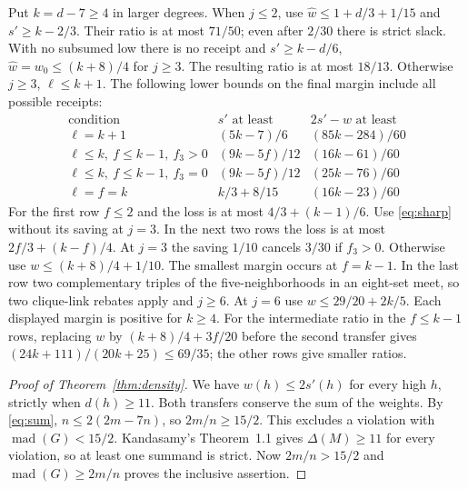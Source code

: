 \documentclass[11pt,a4paper]{amsart}
\DeclareMathOperator{\mad}{mad}
\newcommand{\wt}{\widehat w}
\begin{document}
Put $k=d-7\ge4$ in larger degrees. When $j\le2$, use
$\wt\le1+d/3+1/15$ and $s'\ge k-2/3$. Their ratio is at most
$71/50$; even after $2/30$ there is strict slack. With no
subsumed low there is no receipt and $s'\ge k-d/6$,
$\wt=w_0\le(k+8)/4$ for $j\ge3$. The resulting ratio is at
most $18/13$. Otherwise $j\ge3$, $\ell\le k+1$. The following
lower bounds on the final margin include all possible receipts:
\[
\begin{array}{l|c|c}
 \text{condition}&s'\text{ at least}&2s'-w\text{ at least}\\ \hline
 \ell=k+1 &(5k-7)/6 &(85k-284)/60\\
 \ell\le k,\ f\le k-1,\ f_3>0 &(9k-5f)/12 &(16k-61)/60\\
 \ell\le k,\ f\le k-1,\ f_3=0 &(9k-5f)/12 &(25k-76)/60\\
 \ell=f=k & k/3+8/15 &(16k-23)/60
\end{array}
\]
For the first row $f\le2$ and the loss is at most
$4/3+(k-1)/6$. Use \eqref{eq:sharp} without its saving at
$j=3$. In the next two rows the loss is at most
$2f/3+(k-f)/4$. At $j=3$ the saving $1/10$ cancels $3/30$ if
$f_3>0$. Otherwise use $w\le(k+8)/4+1/10$. The smallest margin
occurs at $f=k-1$. In the last row two complementary triples of
the five-neighborhoods in an eight-set meet, so two clique-link
rebates apply and $j\ge6$. At $j=6$ use
$w\le29/20+2k/5$. Each displayed margin is positive for $k\ge4$.
For the intermediate ratio in the $f\le k-1$ rows, replacing
$w$ by $(k+8)/4+3f/20$ before the second transfer gives
$(24k+111)/(20k+25)\le69/35$; the other rows give smaller
ratios.

\begin{proof}[Proof of Theorem~\ref{thm:density}]
We have $w(h)\le2s'(h)$ for every high $h$, strictly when
$d(h)\ge11$. Both transfers conserve the sum of the weights. By
\eqref{eq:sum}, $n\le2(2m-7n)$, so $2m/n\ge15/2$. This excludes
a violation with $\mad(G)<15/2$. Kandasamy's Theorem~1.1
\cite{kandasamy} gives $\Delta(M)\ge11$ for every violation,
so at least one summand is strict. Now $2m/n>15/2$ and
$\mad(G)\ge2m/n$ proves the inclusive assertion.
\end{proof}
\end{document}
